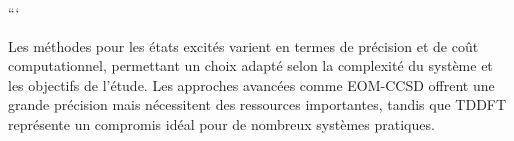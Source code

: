 \documentclass[12pt,a4paper]{report}
\begin{document}
\begin{markdown}
```

Les méthodes pour les états excités varient en termes de précision et de coût computationnel, permettant un choix adapté selon la complexité du système et les objectifs de l'étude. Les approches avancées comme EOM-CCSD offrent une grande précision mais nécessitent des ressources importantes, tandis que TDDFT représente un compromis idéal pour de nombreux systèmes pratiques.

\end{markdown}
\end{document}
